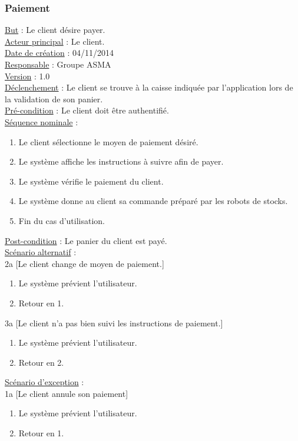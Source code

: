 \subsubsection{Paiement}
	\underline{But} : Le client désire payer.\\
	\underline{Acteur principal} : Le client.\\
	\underline{Date de création} : 04/11/2014\\
	\underline{Responsable} : Groupe ASMA\\
	\underline{Version} : 1.0\\
	\underline{Déclenchement} : Le client se trouve à la caisse indiquée par l'application lors de la validation de son panier.\\
	\underline{Pré-condition} : Le client doit être authentifié.\\
	\underline{Séquence nominale} :
		\begin{enumerate}
			\item Le client sélectionne le moyen de paiement désiré.
			\item Le système affiche les instructions à suivre afin de payer.
			\item Le système vérifie le paiement du client.
			\item Le système donne au client sa commande préparé par les robots de stocks.
			\item Fin du cas d'utilisation.
		\end{enumerate}
	\underline{Post-condition} : Le panier du client est payé.\\
	\underline{Scénario alternatif} :\\
		2a [Le client change de moyen de paiement.]
	 		\begin{enumerate}[label=2a.\arabic* ]
	 			\item Le système prévient l'utilisateur.
	 			\item Retour en 1.
 			\end{enumerate}
		3a [Le client n'a pas bien suivi les instructions de paiement.]
 			\begin{enumerate}[label=3a.\arabic* ]
 				\item Le système prévient l'utilisateur.
 				\item Retour en 2.
 			\end{enumerate}
	 \underline{Scénario d'exception} :\\
	 	1a [Le client annule son paiement]
	 		\begin{enumerate}[label=1a.\arabic* ]
	 			\item Le système prévient l'utilisateur.
	 			\item Retour en 1.
	 		\end{enumerate}
